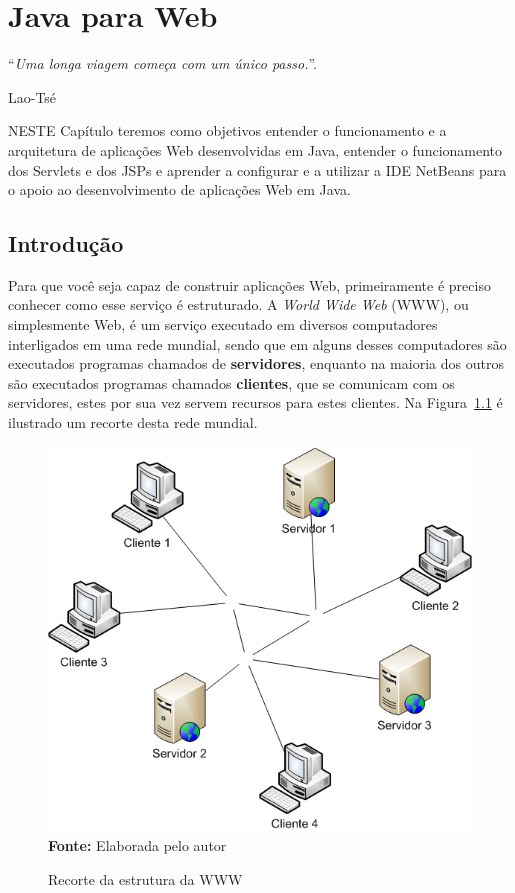 \chapter{Java para Web}
\epigraph{``\textit{Uma longa viagem começa com um único passo.}''.}{Lao-Tsé}

\lettrine[lines=4, lhang=0.1, lraise=0, loversize=0.2, findent=0.1em]{\textcolor{corAzulTema}{N}}{ESTE} Capítulo teremos como objetivos entender o funcionamento e a arquitetura de aplicações Web desenvolvidas em Java, entender o funcionamento dos Servlets e dos JSPs e aprender a configurar e a utilizar a IDE NetBeans para o apoio ao desenvolvimento de aplicações Web em Java.


\section{Introdução}

Para que você seja capaz de construir aplicações Web, primeiramente é preciso conhecer como esse serviço é estruturado. A \textit{World Wide Web} (WWW), ou simplesmente Web, é um serviço executado em diversos computadores interligados em uma rede mundial, sendo que em alguns desses computadores são executados programas chamados de \textbf{servidores}, enquanto na maioria dos outros são executados programas chamados \textbf{clientes}, que se comunicam com os servidores, estes por sua vez servem recursos para estes clientes. Na Figura~\ref{fig:cap01ClienteServidor} é ilustrado um recorte desta rede mundial.

\FloatBarrier
\begin{figure}[!htbp]
    \centering
    \caption{Recorte da estrutura da WWW}
    \includegraphics[scale=0.6]{imagens/cap01ClienteServidor}
    \\\textbf{Fonte:} Elaborada pelo autor
    \label{fig:cap01ClienteServidor}
\end{figure}
\FloatBarrier

